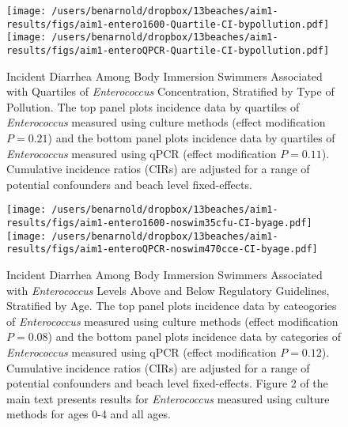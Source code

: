 \documentclass[12pt]{article}\usepackage[]{graphicx}\usepackage[]{color}
\begin{document}
\begin{figure}
\begin{center}
\texttt{[image: /users/benarnold/dropbox/13beaches/aim1-results/figs/aim1-entero1600-Quartile-CI-bypollution.pdf]} \\
\texttt{[image: /users/benarnold/dropbox/13beaches/aim1-results/figs/aim1-enteroQPCR-Quartile-CI-bypollution.pdf]}
\caption{Incident Diarrhea Among Body Immersion Swimmers Associated with Quartiles of \textit{Enterococcus} Concentration, Stratified by Type of Pollution. The top panel plots incidence data by quartiles of \textit{Enterococcus} measured using culture methods (effect modification $P=0.21$) and the bottom panel plots incidence data by quartiles of \textit{Enterococcus} measured using qPCR (effect modification $P=0.11$).  Cumulative incidence ratios (CIRs) are adjusted for a range of potential confounders and beach level fixed-effects.   \label{fig:Qenteropol}}
\end{center}
\end{figure}

\begin{landscape}
\begin{figure}
\begin{center}
\texttt{[image: /users/benarnold/dropbox/13beaches/aim1-results/figs/aim1-entero1600-noswim35cfu-CI-byage.pdf]} 
\texttt{[image: /users/benarnold/dropbox/13beaches/aim1-results/figs/aim1-enteroQPCR-noswim470cce-CI-byage.pdf]} \\
\caption{Incident Diarrhea Among Body Immersion Swimmers Associated with \textit{Enterococcus} Levels Above and Below Regulatory Guidelines, Stratified by Age. The top panel plots incidence data by cateogories of \textit{Enterococcus} measured using culture methods (effect modification $P=0.08$) and the bottom panel plots incidence data by categories of \textit{Enterococcus} measured using qPCR (effect modification $P=0.12$). Cumulative incidence ratios (CIRs) are adjusted for a range of potential confounders and beach level fixed-effects. Figure 2 of the main text presents results for \textit{Enterococcus} measured using culture methods for ages 0-4 and all ages. \label{fig:enteroregage}}
\end{center}
\end{figure}
\end{landscape}
\end{document}
